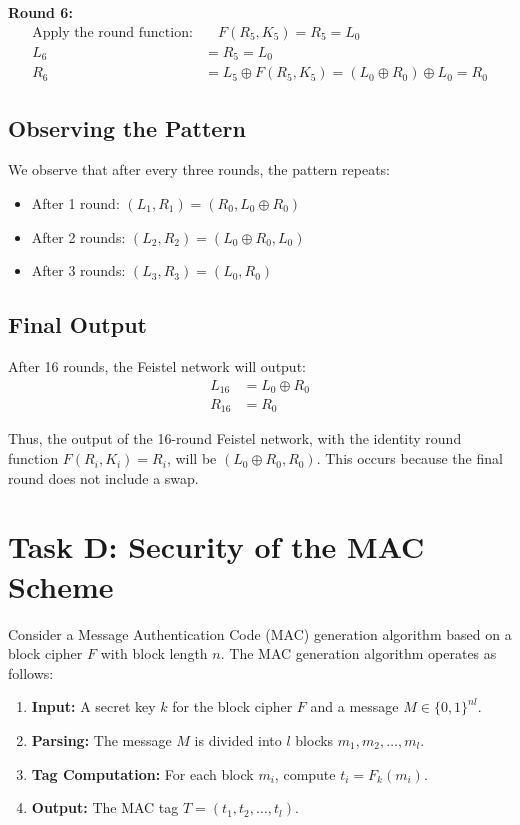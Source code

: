 \documentclass[12pt]{article}
\begin{document}
\textbf{Round 6:}
\begin{align*}
    \text{Apply the round function:} & \quad F(R_5, K_5) = R_5 = L_0 \\
    L_6 &= R_5 = L_0 \\
    R_6 &= L_5 \oplus F(R_5, K_5) = (L_0 \oplus R_0) \oplus L_0 = R_0
\end{align*}

\subsection*{Observing the Pattern}

We observe that after every three rounds, the pattern repeats:
\begin{itemize}
    \item After 1 round: \( (L_1, R_1) = (R_0, L_0 \oplus R_0) \)
    \item After 2 rounds: \( (L_2, R_2) = (L_0 \oplus R_0, L_0) \)
    \item After 3 rounds: \( (L_3, R_3) = (L_0, R_0) \)
\end{itemize}

\subsection*{Final Output}

After 16 rounds, the Feistel network will output:
\begin{align*}
    L_{16} &= L_0 \oplus R_0 \\
    R_{16} &= R_0
\end{align*}

Thus, the output of the 16-round Feistel network, with the identity round function \( F(R_i, K_i) = R_i \), will be \( (L_0 \oplus R_0, R_0) \). This occurs because the final round does not include a swap.

\section{Task D: Security of the MAC Scheme}

Consider a Message Authentication Code (MAC) generation algorithm based on a block cipher \( F \) with block length \( n \). The MAC generation algorithm operates as follows:

\begin{enumerate}
    \item \textbf{Input:} A secret key \( k \) for the block cipher \( F \) and a message \( M \in \{0,1\}^{nl} \).
    \item \textbf{Parsing:} The message \( M \) is divided into \( l \) blocks \( m_1, m_2, \ldots, m_l \).
    \item \textbf{Tag Computation:} For each block \( m_i \), compute \( t_i = F_k(m_i) \).
    \item \textbf{Output:} The MAC tag \( T = (t_1, t_2, \ldots, t_l) \).
\end{enumerate}
\end{document}

